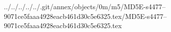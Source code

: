 ../../../../../.git/annex/objects/0m/m5/MD5E-s4477--9071ce5faaa4928eacb461d30c5e6325.tex/MD5E-s4477--9071ce5faaa4928eacb461d30c5e6325.tex